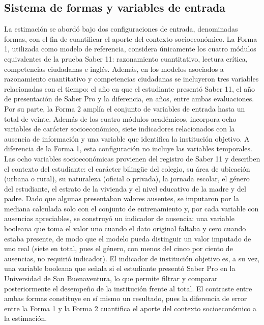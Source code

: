 \subsection{Sistema de formas y variables de entrada}
La estimación se abordó bajo dos configuraciones de entrada, denominadas formas, con el fin de cuantificar el aporte del contexto socioeconómico. La Forma 1, utilizada como modelo de referencia, considera únicamente los cuatro módulos equivalentes de la prueba Saber 11: razonamiento cuantitativo, lectura crítica, competencias ciudadanas e inglés. Además, en los modelos asociados a razonamiento cuantitativo y competencias ciudadanas se incluyeron tres variables relacionadas con el tiempo: el año en que el estudiante presentó Saber 11, el año de presentación de Saber Pro y la diferencia, en años, entre ambas evaluaciones. Por su parte, la Forma 2 amplía el conjunto de variables de entrada hasta un total de veinte. Además de los cuatro módulos académicos, incorpora ocho variables de carácter socioeconómico, siete indicadores relacionados con la ausencia de información y una variable que identifica la institución objetivo. A diferencia de la Forma 1, esta configuración no incluye las variables temporales.
Las ocho variables socioeconómicas provienen del registro de Saber 11 y describen el contexto del estudiante: el carácter bilingüe del colegio, su área de ubicación (urbana o rural), su naturaleza (oficial o privada), la jornada escolar, el género del estudiante, el estrato de la vivienda y el nivel educativo de la madre y del padre. Dado que algunas presentaban valores ausentes, se imputaron por la mediana calculada solo con el conjunto de entrenamiento y, por cada variable con ausencias apreciables, se construyó un indicador de ausencia: una variable booleana que toma el valor uno cuando el dato original faltaba y cero cuando estaba presente, de modo que el modelo pueda distinguir un valor imputado de uno real (siete en total, pues el género, con menos del cinco por ciento de ausencias, no requirió indicador). El indicador de institución objetivo es, a su vez, una variable booleana que señala si el estudiante presentó Saber Pro en la Universidad de San Buenaventura, lo que permite filtrar y comparar posteriormente el desempeño de la institución frente al total. El contraste entre ambas formas constituye en sí mismo un resultado, pues la diferencia de error entre la Forma 1 y la Forma 2 cuantifica el aporte del contexto socioeconómico a la estimación.

